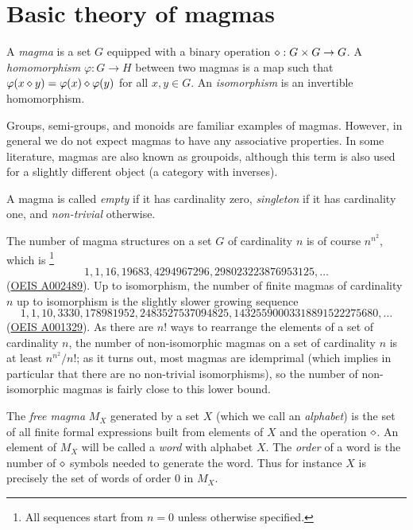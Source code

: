 \chapter{Basic theory of magmas}\label{basic-theory-chapter}
\begin{definition}[Magma]\label{magma-def}\leanok
  A \emph{magma} is a set $G$ equipped with a binary operation $\diamond: G \times G \to G$.
  A \emph{homomorphism} $\varphi : G \to H$ between two magmas is a map such that $\varphi(x \diamond y) = \varphi(x) \diamond \varphi(y)$ for all $x,y \in G$.
  An \emph{isomorphism} is an invertible homomorphism.
\end{definition}

Groups, semi-groups, and monoids are familiar examples of magmas. However, in general we do not expect magmas to have any associative properties. In some literature, magmas are also known as groupoids, although this term is also used for a slightly different object (a category with inverses).

A magma is called \emph{empty} if it has cardinality zero, \emph{singleton} if it has cardinality one, and \emph{non-trivial} otherwise.

The number of magma structures on a set $G$ of cardinality $n$ is of course $n^{n^2}$, which is \footnote{All sequences start from $n=0$ unless otherwise specified.}
$$ 1, 1, 16, 19683, 4294967296, 298023223876953125, \dots$$
(\href{https://oeis.org/A002489}{OEIS A002489}).
Up to isomorphism, the number of finite magmas of cardinality $n$ up to isomorphism is the slightly slower growing sequence
$$ 1, 1, 10, 3330, 178981952, 2483527537094825, 14325590003318891522275680, \dots$$
(\href{https://oeis.org/A001329}{OEIS A001329}).  As there are $n!$ ways to rearrange the elements of a set of cardinality $n$, the number of non-isomorphic magmas on a set of cardinality $n$ is at least $n^{n^2}/n!$; as it turns out, most magmas are idemprimal (which implies in particular that there are no non-trivial isomorphisms), so the number of non-isomorphic magmas is fairly close to this lower bound.

\begin{definition}\label{free-magma-def}\leanok{}
  The \emph{free magma} $M_X$ generated by a set $X$ (which we call an \emph{alphabet}) is the set of all finite formal expressions built from elements of $X$ and the operation $\diamond$.
  An element of $M_X$ will be called a \emph{word} with alphabet $X$.
  The \emph{order} of a word is the number of $\diamond$ symbols needed to generate the word.
  Thus for instance $X$ is precisely the set of words of order $0$ in $M_X$.
\end{definition}

